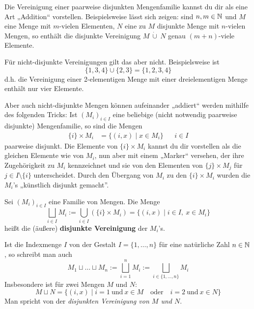 \begin{bem}
    Die Vereinigung einer paarweise disjunkten Mengenfamilie kannst du dir als eine Art „Addition“ vorstellen. Beispielsweise lässt sich zeigen: sind $n,m\in \mathbb N$ und $M$ eine Menge mit $m$-vielen Elementen, $N$ eine zu $M$ disjunkte Menge mit $n$-vielen Mengen, so enthält die disjunkte Vereinigung $M\ \dot\cup\ N$ genau $(m+n)$-viele Elemente.

    Für nicht-disjunkte Vereinigungen gilt das aber nicht. Beispielsweise ist
        \[\{1,3,4\} \cup \{2,3\}= \{1,2,3,4\} \]
    d.h. die Vereinigung einer 2-elementigen Menge mit einer dreielementigen Menge enthält nur vier Elemente.

    Aber auch nicht-disjunkte Mengen können aufeinander „addiert“ werden mithilfe des folgenden Tricks: Ist $(M_i)_{i\in I}$ eine beliebige (nicht notwendig paarweise disjunkte) Mengenfamilie, so sind die Mengen
    \begin{align*}
        \{i\}\times M_i &= \{(i,x) \mid x\in M_i\} && i\in I
    \end{align*}
    paarweise disjunkt. Die Elemente von $\{i\}\times M_i$ kannst du dir vorstellen als die gleichen Elemente wie von $M_i$, nun aber mit einem „Marker“ versehen, der ihre Zugehörigkeit zu $M_i$ kennzeichnet und sie von den Elementen von $\{j\}\times M_j$ für $j\in I\setminus \{i\}$ unterscheidet. Durch den Übergang von $M_i$ zu den $\{i\}\times M_i$ wurden die $M_i$'s „künstlich disjunkt gemacht”. 
\end{bem}


\begin{de} \label{def:disjunktcup} 
    Sei $(M_i)_{i\in I}$ eine Familie von Mengen. Die Menge
        \[ \bigsqcup_{i\in I} M_i := \bigcup_{i\in I} (\{i\}\times M_i) = \{(i,x) \mid i\in I,\ x\in M_i \}\]
    heißt die (äußere) \textbf{disjunkte Vereinigung} der $M_i$'s.
    
    Ist die Indexmenge $I$ von der Gestalt $I=\{1,\dots , n\}$ für eine natürliche Zahl $n\in \mathbb N$, so schreibt man auch
        \[ M_1\sqcup\ldots\sqcup M_n := \bigsqcup_{i=1}^n M_i := \bigsqcup_{i\in \{1,\dots , n\}} M_i \]
    Insbesondere ist für zwei Mengen $M$ und $N$:
        \[ M\sqcup N = \{ (i,x)\mid i=1\ \text{und}\ x\in M\quad\text{oder}\quad i=2\ \text{und}\ x\in N\} \]
    Man spricht von der \emph{disjunkten Vereinigung von $M$ und $N$}.
\end{de}


